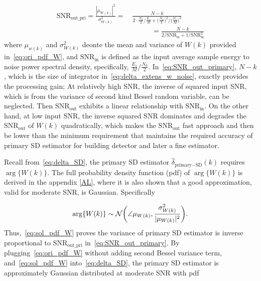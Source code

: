 \begin{equation}
  \begin{aligned}
    \label{eq:SNR_out_primary}
    \text{SNR}_{\text{out\_pri}}=\frac{|\mu_{W(k)}|^2}{\sigma^2_{W(k)}} 
    =&~\frac{N-k}{\displaystyle 2\cdot\frac{N_0}{2}/\frac{E_s}{M}+\Big(\frac{N_0}{2}\Big)^2/\Big(\frac{E_s}{M}\Big)^2} \\
    &~~~~~~~~~\quad =\frac{N-k}{2/\text{SNR}_{\text{in}}+1/\text{SNR}_{\text{in}}^2}
  \end{aligned}
\end{equation}
where $\mu_{w(k)}$ and $\sigma^2_{W(k)}$ deonte the mean and variance of $W(k)$ provided in~\eqref{eq:ori_pdf_W}, and $\text{SNR}_{\text{in}}$ is defined as the input average sample energy to noise power spectral density, specifically, $\frac{E_s}{M}/\frac{N_0}{2}$. In~\eqref{eq:SNR_out_primary}, 
$N-k$, which is the size of integrator in~\eqref{eq:delta_extens_w_noise}, exactly provides the processing gain; At relatively high SNR,
the inverse of squared input SNR, which is from the variance of second kind Bessel random variable, can be neglected. Then $\text{SNR}_{\text{out}}$
exhibits a linear relationship with $\text{SNR}_{\text{in}}$. On the other hand, at low input SNR, the inverse squared SNR dominates and degrades the $\text{SNR}_{\text{out}}$
of $W(k)$ quadratically, which makes the $\text{SNR}_{\text{out}}$ fast approach and then be lower than the minimum requirement that maintains the required accuracy of 
primary SD estimator for building detector and later a fine estimator.

Recall from~\eqref{eq:delta_SD}, the primary SD estimator $\hat{\delta}_{\text{primary}-\text{SD}}(k)$ requires $\arg\{W(k)\}$.
The full probability density function (pdf) of $\arg\{W(k)\}$ is derived in the appendix \ref{AL},
where it is also shown that a good approximation, valid for moderate SNR, 
is Gaussian. Specifically 

\begin{equation}
    \label{eq:sol_pdf_W}
    \arg\{W(k)\} \sim \mathcal{N}\bigg(\angle \mu_{W(k)},\frac{\sigma^2_{W(k)}}{|\mu_{W(k)}|^2}\bigg).
  \end{equation}
Thus,~\eqref{eq:sol_pdf_W} proves the variance of primary SD estimator is inverse proportional to $\text{SNR}_{\text{out\_pri}}$ in~\eqref{eq:SNR_out_primary}.
By plugging~\eqref{eq:ori_pdf_W} without adding second Bessel variance term, and~\eqref{eq:sol_pdf_W} into~\eqref{eq:delta_SD}, the primary SD estimator
is approximately Gaussian distributed at moderate SNR with pdf

